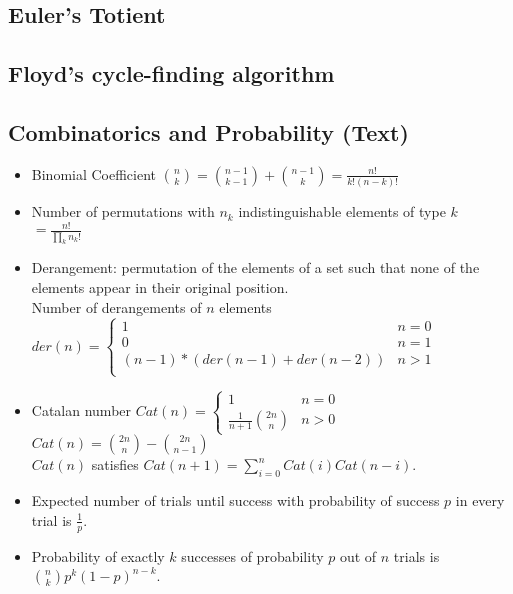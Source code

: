 \documentclass[9pt]{extarticle}
\begin{document}
\begin{multicols*}{3}
\subsection{Euler's Totient} %


\subsection{Floyd's cycle-finding algorithm}


\subsection{Combinatorics and Probability (Text)}
\begin{itemize}
\item Binomial Coefficient $\binom{n}{k} = \binom{n - 1}{k - 1} + \binom{n - 1}{k} = \frac{n!}{k!(n - k)!}$
\item Number of permutations with $n_k$ indistinguishable elements of type $k$ $ = \frac{n!}{\prod_{k}n_k!}$
\item Derangement: permutation of the elements of a set such that none of the elements appear in their original position. \\
Number of derangements of $n$ elements \\
$der(n) = \begin{cases}
1 & \text{$n = 0$} \\
0 & \text{$n = 1$} \\
(n - 1) * (der(n - 1) + der(n - 2)) & \text{$n > 1$} \\
\end{cases}$
\item Catalan number $Cat(n) = \begin{cases}
1 & \text{$n = 0$} \\
\frac{1}{n + 1}\binom{2n}{n} & \text{$n > 0$}
\end{cases}$ \\
$Cat(n) = \binom{2n}{n} - \binom{2n}{n - 1}$ \\
$Cat(n)$ satisfies $Cat(n + 1) = \sum_{i = 0}^{n} Cat(i)Cat(n - i)$.
\item Expected number of trials until success with probability of success $p$ in every trial is $\frac{1}{p}$.
\item Probability of exactly $k$ successes of probability $p$ out of $n$ trials is $\binom{n}{k}p^k(1 - p)^{n-k}$.
\end{itemize}


\end{multicols*}
\end{document}

